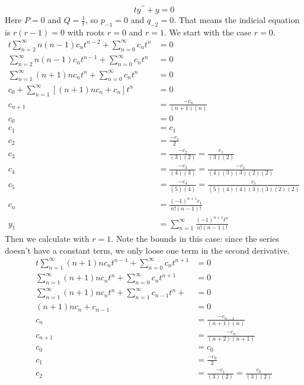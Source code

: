 \documentclass[fleqn,letterpaper]{report}
\begin{document}
\begin{example}
\begin{equation*}
ty^{\prime \prime} + y = 0 
\end{equation*}
Here $P =0$ and $Q=\frac{1}{t}$, so $p_{-1} = 0$ and $q_{-2} = 0$.
That means the indicial equation is $r(r-1) = 0$ with roots
$r=0$ and $r=1$. We start with the case $r=0$.
\begin{align*}
t \sum_{n=2}^\infty n(n-1)c_n t^{n-2} + \sum_{n=0}^\infty c_n
t^n & = 0 \\
\sum_{n=2}^\infty n(n-1)c_n t^{n-1} + \sum_{n=0}^\infty c_n
t^n & = 0 \\
\sum_{n=1}^\infty (n+1)nc_n t^n + \sum_{n=0}^\infty c_n
t^n & = 0 \\
c_0 + \sum_{n=1}^\infty \left[ (n+1)nc_n + c_n \right] 
t^n & = 0 \\
c_{n+1} & = \frac{-c_n}{(n+1)(n)} \\
c_0 & = 0 \\
c_1 & = c_1 \\
c_2 & = \frac{-c_1}{2} \\
c_3 & = \frac{-c_2}{(3)(2)} = \frac{c_1}{(3)(2)}\\
c_4 & = \frac{-c_3}{(4)(3)} = \frac{-c_1}{(4)(3)(3)(2)(2)} \\
c_5 & = \frac{-c_4}{(5)(4)} = \frac{c_1}{(5)(4)(4)(3)(3)(2)(2)} \\
c_n & = \frac{(-1)^{n+1} c_1}{n! (n-1)!} \\
y_1 & = \sum_{n=1}^\infty \frac{(-1)^{n+1} t^n}{n!(n-1)!}
\end{align*}
Then we calculate with $r=1$. Note the bounds in this case:
since the series doesn't have a constant term, we only loose
one term in the second derivative.
\begin{align*}
t \sum_{n=1}^\infty (n+1)nc_n t^{n-1} + \sum_{n=0}^\infty c_n
t^{n+1} & = 0 \\
\sum_{n=1}^\infty (n+1)nc_n t^n + \sum_{n=0}^\infty c_n
t^{n+1} & = 0 \\
\sum_{n=1}^\infty (n+1)nc_n t^n + \sum_{n=1}^\infty c_{n-1}
t^n+ & = 0 \\
(n+1)n c_n + c_{n-1} & = 0 \\
c_n & = \frac{-c_{n-1}}{(n+1)(n)} \\
c_{n+1} & = \frac{-c_n}{(n+2)(n+1)} \\
c_0 & = c_0 \\
c_1 & = \frac{-c_0}{2} \\
c_2 & = \frac{-c_1}{(3)(2)} = \frac{c_0}{(3)(2)}\\

\end{align*}
\end{example}
\end{document}
